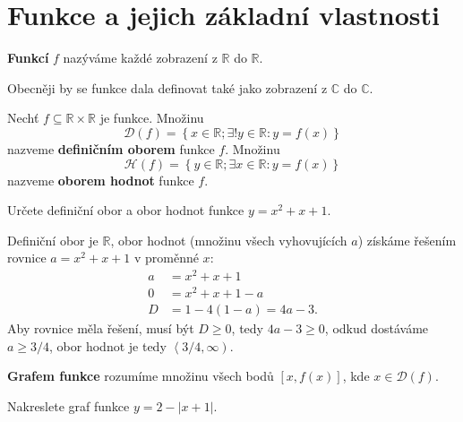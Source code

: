 \section{Funkce a jejich základní vlastnosti}
\begin{definition}
  \textbf{Funkcí} $f$ nazýváme každé zobrazení z $\mathbb R$ do $\mathbb R$.
\end{definition}

\begin{pozn}
  Obecněji by se funkce dala definovat také jako zobrazení z $\mathbb C$ do $\mathbb C$.
\end{pozn}

\begin{definition}
  Nechť $f\subseteq \mathbb R \times \mathbb R$ je funkce. Množinu
  \[
    \mathcal D(f) = \left  \{ x \in \mathbb R;\exists ! y \in \mathbb R\colon y=f(x) \right \}
  \]
  nazveme \textbf{definičním oborem} funkce $f$. Množinu
  \[
    \mathcal H(f) = \left  \{ y \in \mathbb R;\exists  x \in \mathbb R\colon y=f(x) \right \}
  \]
  nazveme \textbf{oborem hodnot} funkce $f$.
\end{definition}

\begin{priklad}
Určete definiční obor a obor hodnot funkce $y=x^2+x+1.$
\end{priklad}

\begin{reseni}
Definiční obor je $\mathbb R$, obor hodnot (množinu všech vyhovujících $a$)
získáme řešením rovnice $a=x^2+x+1$ v proměnné $x$:
\begin{align*}
	a &= x^2+x+1 \\
	0 &= x^2+x+1-a \\
	D&= 1-4(1-a)=4a-3.
\end{align*}
Aby rovnice měla řešení, musí být $D\geq 0$, tedy $4a-3\geq 0$, odkud dostáváme $a\geq 3/4$,
obor hodnot je tedy $\left<  3/4, \infty \right ). $
\end{reseni}

\begin{pozn}
  \textbf{Grafem funkce} rozumíme množinu všech bodů $[x,f(x)]$, kde $x\in \mathcal D(f).$
\end{pozn}

\begin{priklad}
Nakreslete graf funkce $y=2-|x+1|.$
\end{priklad}

